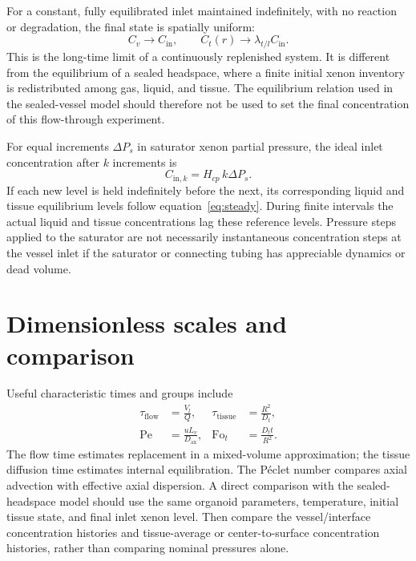 \documentclass[11pt]{article}
\begin{document}
For a constant, fully equilibrated inlet maintained indefinitely, with no
reaction or degradation, the final state is spatially uniform:
\begin{equation}
  C_v \longrightarrow C_{\mathrm{in}}, \qquad
  C_t(r) \longrightarrow \lambda_{t/l}C_{\mathrm{in}}.
  \label{eq:steady}
\end{equation}
This is the long-time limit of a continuously replenished system. It is
different from the equilibrium of a sealed headspace, where a finite initial
xenon inventory is redistributed among gas, liquid, and tissue. The
equilibrium relation used in the sealed-vessel model should therefore not be
used to set the final concentration of this flow-through experiment.

For equal increments \(\Delta P_s\) in saturator xenon partial pressure, the
ideal inlet concentration after \(k\) increments is
\begin{equation}
  C_{\mathrm{in},k}=H_{cp}\,k\Delta P_s.
  \label{eq:steps}
\end{equation}
If each new level is held indefinitely before the next, its corresponding
liquid and tissue equilibrium levels follow equation~\eqref{eq:steady}.
During finite intervals the actual liquid and tissue concentrations lag
these reference levels. Pressure steps applied to the saturator are not
necessarily instantaneous concentration steps at the vessel inlet if the
saturator or connecting tubing has appreciable dynamics or dead volume.

\section{Dimensionless scales and comparison}

Useful characteristic times and groups include
\begin{align}
  \tau_{\mathrm{flow}} &= \frac{V_l}{Q},
  &\tau_{\mathrm{tissue}} &= \frac{R^2}{D_t},\\
  \mathrm{Pe} &= \frac{uL_v}{D_{\mathrm{ax}}},
  &\mathrm{Fo}_t &= \frac{D_t t}{R^2}.
\end{align}
The flow time estimates replacement in a mixed-volume approximation; the
tissue diffusion time estimates internal equilibration. The P\'eclet number
compares axial advection with effective axial dispersion. A direct comparison
with the sealed-headspace model should use the same organoid parameters,
temperature, initial tissue state, and final inlet xenon level. Then compare
the vessel/interface concentration histories and tissue-average or
center-to-surface concentration histories, rather than comparing nominal
pressures alone.
\end{document}
